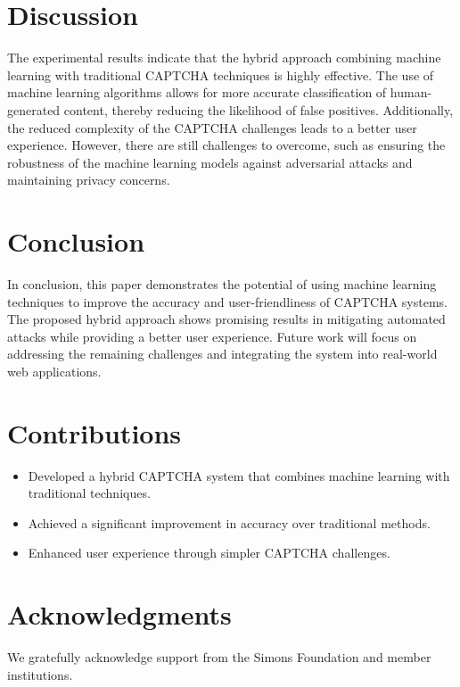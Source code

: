 \documentclass{article}
\begin{document}
\section{Discussion}
The experimental results indicate that the hybrid approach combining machine learning with traditional CAPTCHA techniques is highly effective. The use of machine learning algorithms allows for more accurate classification of human-generated content, thereby reducing the likelihood of false positives. Additionally, the reduced complexity of the CAPTCHA challenges leads to a better user experience. However, there are still challenges to overcome, such as ensuring the robustness of the machine learning models against adversarial attacks and maintaining privacy concerns.

\section{Conclusion}
In conclusion, this paper demonstrates the potential of using machine learning techniques to improve the accuracy and user-friendliness of CAPTCHA systems. The proposed hybrid approach shows promising results in mitigating automated attacks while providing a better user experience. Future work will focus on addressing the remaining challenges and integrating the system into real-world web applications.

\section{Contributions}
\begin{itemize}
    \item Developed a hybrid CAPTCHA system that combines machine learning with traditional techniques.
    \item Achieved a significant improvement in accuracy over traditional methods.
    \item Enhanced user experience through simpler CAPTCHA challenges.
\end{itemize}

\section*{Acknowledgments}
We gratefully acknowledge support from the Simons Foundation and member institutions.



\end{document}

